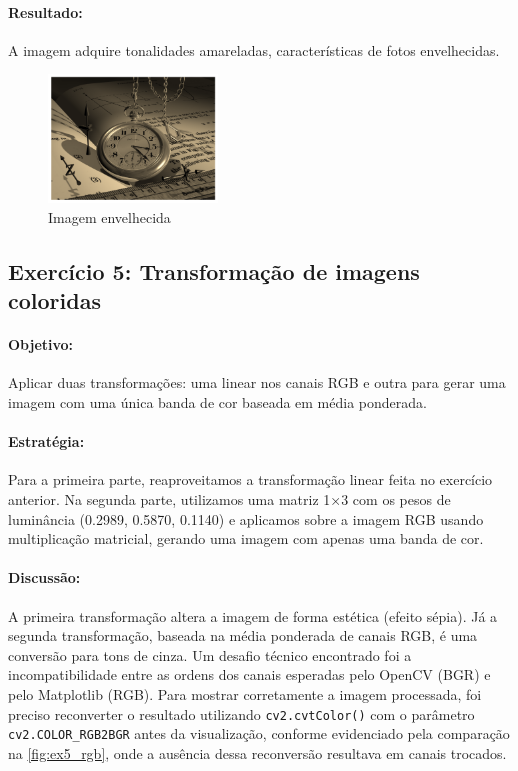 \documentclass[12pt,a4paper]{report}
\begin{document}
\paragraph{Resultado:} 
A imagem adquire tonalidades amareladas, características de fotos envelhecidas.
\begin{figure}[H]
  \centering
  \includegraphics[width=0.4\textwidth]{imagens/ex4.png}
  \caption{Imagem envelhecida}
\end{figure}

\subsection{Exercício 5: Transformação de imagens coloridas}
\paragraph{Objetivo:} 
Aplicar duas transformações: uma linear nos canais RGB e outra para gerar uma imagem com uma única banda de cor baseada em média ponderada.

\paragraph{Estratégia:} 
Para a primeira parte, reaproveitamos a transformação linear feita no exercício anterior. Na segunda parte, utilizamos uma matriz 1×3 com os pesos de luminância (0.2989, 0.5870, 0.1140) e aplicamos sobre a imagem RGB usando multiplicação matricial, gerando uma imagem com apenas uma banda de cor.

\paragraph{Discussão:} 
A primeira transformação altera a imagem de forma estética (efeito sépia). Já a segunda transformação, baseada na média ponderada de canais RGB, é uma conversão para tons de cinza. Um desafio técnico encontrado foi a incompatibilidade entre as ordens dos canais esperadas pelo OpenCV (BGR) e pelo Matplotlib (RGB). Para mostrar corretamente a imagem processada, foi preciso reconverter o resultado utilizando \texttt{cv2.cvtColor()} com o parâmetro \texttt{cv2.COLOR\_RGB2BGR} antes da visualização, conforme evidenciado pela comparação na \autoref{fig:ex5_rgb}, onde a ausência dessa reconversão resultava em canais trocados.
\end{document}
